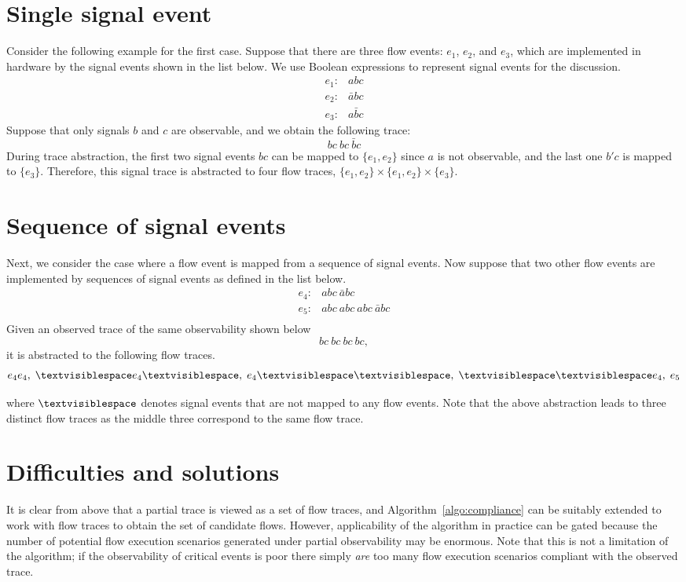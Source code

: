 \documentclass[12pt,frontmatter,copyright,thesis]{usfmanus}
\begin{document}
\section{Single signal event}
Consider the following example for
the first case.  Suppose that there are three flow events:
$e_1$, $e_2$, and $e_3$, which are implemented in hardware
by the signal events shown in the list below.  We use
Boolean expressions to represent signal events for the
discussion.
\[
\begin{array}{cl}
e_1: & abc\\
e_2: & \bar{a}bc\\
e_3: & a\bar{b}c
\end{array}
\] 
Suppose that only signals $b$ and $c$ are observable, and we
obtain the following trace:
\[
bc\ bc \ \bar{b}c
\]
During trace abstraction, the first two signal events $bc$
can be mapped to $\{e_1, e_2\}$ since $a$ is not observable,
and the last one $b'c$ is mapped to $\{e_3\}$.  Therefore,
this signal trace is abstracted to four flow traces, $\{e_1,
e_2\} \times \{e_1, e_2\} \times \{e_3\}$.
\section{Sequence of signal events}
Next, we consider the case where a flow event is mapped from
a sequence of signal events.  Now suppose that two other
flow events are implemented by sequences of signal events as
defined in the list below.
\[
\begin{array}{cl}
e_4: & abc\ \bar{a}bc\\
e_5: & abc\ abc\ abc\ \bar{a}bc\\
\end{array}
\] 
Given an observed trace of the same observability shown below
\[
bc\ bc\ bc \ bc,
\]
it is abstracted to the following flow traces.
\[
e_4e_4,\; \textvisiblespace e_4 \textvisiblespace,\;  e_4 \textvisiblespace \textvisiblespace,\;  \textvisiblespace \textvisiblespace e_4, \; e_5
\] 

where $\textvisiblespace$ denotes signal events that are not
mapped to any flow events.  Note that the above abstraction
leads to three distinct flow traces as the middle three
correspond to the same flow trace.

\section{Difficulties and solutions}
It is clear from above that a partial trace is viewed as a
set of flow traces, and Algorithm~\ref{algo:compliance} can
be suitably extended to work with flow traces to obtain the
set of candidate flows.  However, applicability of the
algorithm in practice can be gated because the number of
potential flow execution scenarios generated under partial
observability may be enormous.  Note that this is not a
limitation of the algorithm; if the observability of
critical events is poor there simply {\em are} too many flow
execution scenarios compliant with the observed trace.
\end{document}
